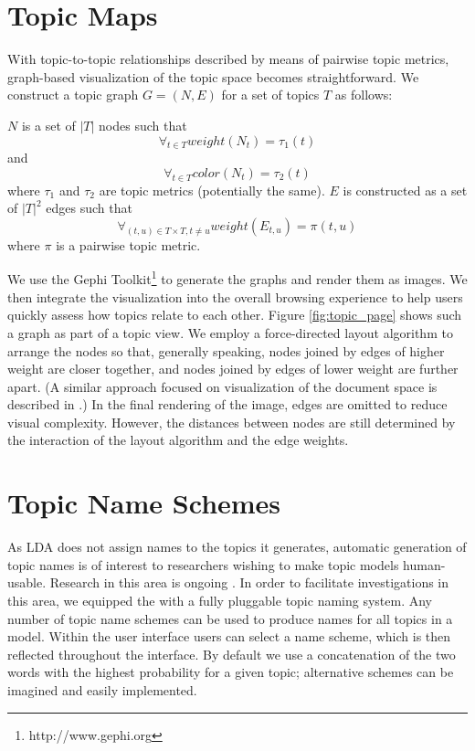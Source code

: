 \documentclass[11pt]{article}
\begin{document}
\section{Topic Maps}\label{sec:maps}
With topic-to-topic relationships described by means of pairwise topic metrics,
graph-based visualization of the topic space becomes straightforward.  We
construct a topic graph $G = (N, E)$ for a set of topics $T$ as follows:

$N$ is a set of $|T|$ nodes such that
\[\forall_{t\in T} weight(N_{t}) = \tau_{1}(t)\]
and
\[\forall_{t\in T} color(N_{t}) = \tau_{2}(t)\]
where $\tau_1$ and $\tau_2$ are topic metrics (potentially the same).
$E$ is constructed as a set of $|T|^2$ edges such that
  \[\forall_{(t,u)\in T\times T, t\neq u} weight(E_{t,u}) = \pi(t,u)\]
where $\pi$ is a pairwise topic metric.

We use the Gephi Toolkit\footnote{http://www.gephi.org} to generate the graphs and
render them as images. We then integrate the visualization into the overall
browsing experience to help users quickly assess how topics relate to each
other. Figure \ref{fig:topic_page} shows such a graph as part of a topic view. 
We employ a force-directed layout algorithm to arrange
the nodes so that, generally speaking, nodes joined by edges of higher weight
are closer together, and nodes joined by edges of lower weight are further
apart. (A similar approach focused on visualization of the document space is
described in .) In the final rendering of the image, edges 
are omitted to reduce visual complexity. However, the distances between nodes
are still determined by the interaction of the layout algorithm and the edge
weights.

\section{Topic Name Schemes}
As LDA does not assign names to the topics it generates, automatic generation of
topic names is of interest to researchers wishing to make topic models
human-usable. Research in this area is ongoing \cite{Mei2007,Lau2010}. In order to
facilitate investigations in this area, we equipped the \tool{} with a
fully pluggable topic naming system. Any number of topic name schemes can be
used to produce names for all topics in a model. Within the user interface
users can select a name scheme, which is then reflected throughout the
interface. By default we use a concatenation of the two
words with the highest probability for a given topic; alternative schemes
can be imagined and easily implemented.%
\end{document}
